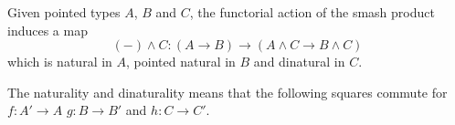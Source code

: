 \documentclass{article}
\newcommand{\pmap}{\to}
\newcommand{\smsh}{\wedge}
\begin{document}
\begin{thm}\label{thm:smash-functor-right}
Given pointed types $A$, $B$ and $C$, the functorial action of the smash product induces a map
$$({-})\smsh C:(A\pmap B)\pmap(A\smsh C\pmap B\smsh C)$$
which is natural in $A$, pointed natural in $B$ and dinatural in $C$.
\end{thm}
The naturality and dinaturality means that the following squares commute for $f : A' \to A$ $g:B\to B'$ and $h:C\to C'$.
\begin{center}
\qquad
{}
\end{center}
\end{document}
